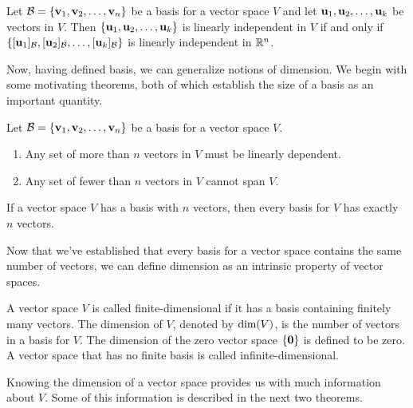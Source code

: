 \documentclass[../m73main.tex]{subfiles}
\begin{document}
\begin{theorem}
	Let $\mathcal{B} = \{\mathbf{v}_1, \mathbf{v}_2, \ldots, \mathbf{v}_n\}$ be a basis for a vector space $V$ and let $\mathbf{u}_1, \mathbf{u}_2, \ldots, \mathbf{u}_k$ be vectors in $V$.
	Then $\{\mathbf{u}_1, \mathbf{u}_2, \ldots, \mathbf{u}_k	\}$ is linearly independent in $V$ if and only if $\{[\mathbf{u}_1]_{\mathcal{B}}, [\mathbf{u}_2]_{\mathcal{B}}, \ldots, [\mathbf{u}_k]_{\mathcal{B}}\}$ is linearly independent in $\mathbb{R}^n$.
\end{theorem}

Now, having defined basis, we can generalize notions of dimension.
We begin with some motivating theorems, both of which establish the size of a basis as an important quantity.

\begin{theorem}
	Let $\mathcal{B} = \{\mathbf{v}_1, \mathbf{v}_2, \ldots, \mathbf{v}_n\}$ be a basis for a vector space $V$.
	\begin{enumerate}[label=(\alph*)]
		\item Any set of more than $n$ vectors in $V$ must be linearly dependent.
		\item Any set of fewer than $n$ vectors in $V$ cannot span $V$.
	\end{enumerate}
\end{theorem}

\begin{theorem}
	If a vector space $V$ has a basis with $n$ vectors, then every basis for $V$ has exactly $n$ vectors.
\end{theorem}

Now that we've established that every basis for a vector space contains the same number of vectors, we can define dimension as an intrinsic property of vector spaces.

\begin{definition}[Dimension]
	A vector space $V$ is called finite-dimensional if it has a basis containing finitely many vectors.
	The dimension of $V$, denoted by $\textrm{dim}(V)$, is the number of vectors in a basis for $V$.
	The dimension of the zero vector space $\{\mathbf{0}\}$ is defined to be zero.
	A vector space that has no finite basis is called infinite-dimensional.
\end{definition}

Knowing the dimension of a vector space provides us with much information about $V$.
Some of this information is described in the next two theorems.
\end{document}
